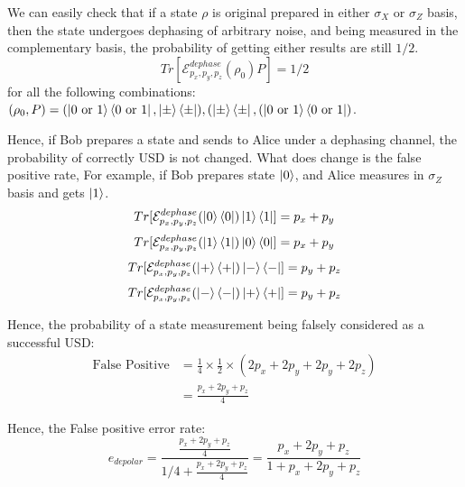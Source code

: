 \documentclass[%
 reprint,
superscriptaddress,
 amsmath,amssymb,
 aps,
]{revtex4-2}
\begin{document}
We can easily check that if a state $\rho$ is original prepared in either $\sigma_X$ or $\sigma_Z$ basis, then the state undergoes dephasing of arbitrary noise, and being measured in the complementary basis, the probability of getting either results are still $1/2$.
\begin{equation}
    Tr[\mathcal{E}^{dephase}_{p_x, p_y, p_z}(\rho_0)P]=1/2
\end{equation}
for all the following combinations: $(\rho_0, P)=(\ket{0\text{ or }1}\bra{0\text{ or }1}, \ket{\pm}\bra{\pm}), (\ket{\pm}\bra{\pm}, (\ket{0\text{ or }1}\bra{0\text{ or }1})$.

Hence, if Bob prepares a state and sends to Alice under a dephasing channel, the probability of correctly USD is not changed. What does change is the false positive rate, For example, if Bob prepares state $\ket{0}$, and Alice measures in $\sigma_Z$ basis and gets $\ket{1}$.
\begin{equation}
Tr[\mathcal{E}^{dephase}_{p_x, p_y, p_z}(\ket{0}\bra{0})\ket{1}\bra{1}]=p_x+p_y
\end{equation}
\begin{equation}
Tr[\mathcal{E}^{dephase}_{p_x, p_y, p_z}(\ket{1}\bra{1})\ket{0}\bra{0}]=p_x+p_y
\end{equation}
\begin{equation}
Tr[\mathcal{E}^{dephase}_{p_x, p_y, p_z}(\ket{+}\bra{+})\ket{-}\bra{-}]=p_y+p_z
\end{equation}
\begin{equation}
Tr[\mathcal{E}^{dephase}_{p_x, p_y, p_z}(\ket{-}\bra{-})\ket{+}\bra{+}]=p_y+p_z
\end{equation}

Hence, the probability of a state measurement being falsely considered as a successful USD:
\begin{equation}
\begin{split}
    \text{False Positive}&=\frac{1}{4}\times\frac{1}{2}\times\left(2p_x+2p_y+2p_y+2p_z\right)\\
    &=\frac{p_x+2p_y+p_z}{4}
    \end{split}
\end{equation}

Hence, the False positive error rate:
\begin{equation}
    e_{depolar}=\frac{\frac{p_x+2p_y+p_z}{4}}{1/4+\frac{p_x+2p_y+p_z}{4}}=\frac{p_x+2p_y+p_z}{1+p_x+2p_y+p_z}
\end{equation}




\end{document}

